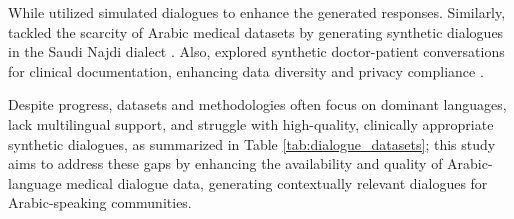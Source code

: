 \documentclass[manuscript,screen,review]{acmart}
\begin{document}
While \cite{liu-etal-2022-prophetchat} utilized simulated dialogues to enhance the generated responses. 
Similarly, \cite{almutairi-etal-2024-synthetic} tackled the scarcity of Arabic medical datasets by generating synthetic dialogues in the Saudi Najdi dialect
\cite{almutairi-etal-2024-synthetic}. Also, \cite{wang2023umassbionlpmediqachat2023llms} explored synthetic doctor-patient conversations for clinical documentation, enhancing data diversity and privacy compliance \cite{wang2023umassbionlpmediqachat2023llms}. 


Despite progress, datasets and methodologies often focus on dominant languages, lack multilingual support, and struggle with high-quality, clinically appropriate synthetic dialogues, as summarized in Table \ref{tab:dialogue_datasets}; this study aims to address these gaps by enhancing the availability and quality of Arabic-language medical dialogue data, generating contextually relevant dialogues for Arabic-speaking communities.
\FloatBarrier
\end{document}
